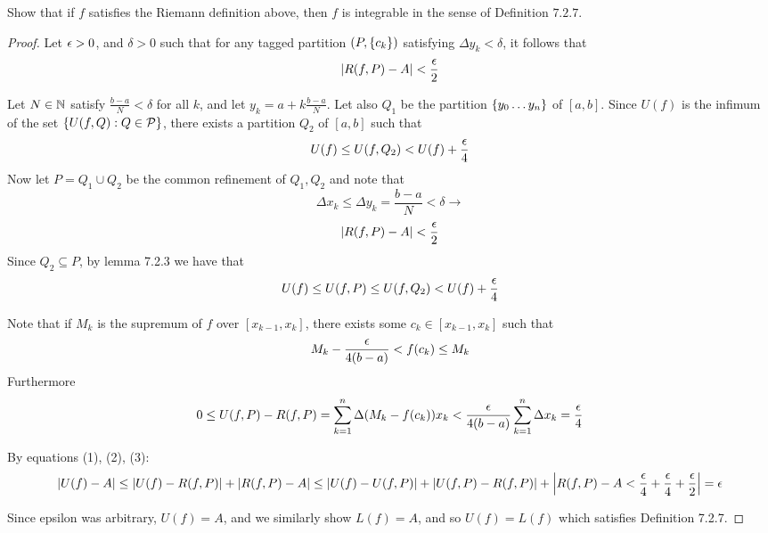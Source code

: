 \documentclass{exam}
\begin{document}
Show that if $f$ satisfies the Riemann definition above, then $f$ is integrable in the sense of Definition $7.2.7$.
\begin{proof}
    Let $\epsilon > 0$, and $\delta > 0$ such that for any tagged partition $(P, \left \{ c_k \right \})$ satisfying $\Delta y_k < \delta$, it follows that
    $$\left| R(f, P) - A \right| < \frac{\epsilon}{2}$$

    Let $N \in \mathbb {N}$ satisfy $\frac{b - a}{N} < \delta$ for all $k$, and let $y_k = a + k\frac{b - a}{N}$. Let also $Q_1$ be the partition $\left \{ y_0 \hdots y_n \right \}$ of $[a, b]$. Since $U(f)$ is the infimum of the set $\left \{ U(f, Q) : Q \in \mathcal{P} \right \}$, there exists a partition $Q_2$ of $[a, b]$ such that
    $$U(f) \leq U(f, Q_2) < U(f) + \frac{\epsilon}{4}$$
    Now let $P = Q_1 \cup Q_2$ be the common refinement of $Q_1, Q_2$ and note that
    $$\Delta x_k \leq \Delta y_k = \frac{b - a}{N} < \delta \longrightarrow$$
    \begin{equation}\left| R(f, P) - A \right| < \frac{\epsilon}{2}\end{equation}
    Since $Q_2 \subseteq P$, by lemma 7.2.3 we have that
    \begin{equation}U(f) \leq U(f, P) \leq U(f, Q_2) < U(f) + \frac{\epsilon}{4}\end{equation}

    Note that if $M_k$ is the supremum of $f$ over $[x_{k - 1}, x_k]$, there exists some $c_k\in [x_{k - 1}, x_k]$ such that
    $$M_k - \frac{\epsilon}{4(b - a)} < f(c_k) \leq M_k$$
    Furthermore
    \begin{equation}0 \leq U(f, P) - R(f, P) = \sum_{k = 1}^n \Delta (M_k - f(c_k))x_k < \frac{\epsilon}{4(b - a)}\sum_{k = 1}^n \Delta x_k = \frac{\epsilon}{4}\end{equation}

    By equations (1), (2), (3):
    $$\left| U(f) - A \right| \leq \left| U(f) - R(f, P) \right| + \left| R(f, P) - A \right| \leq \left| U(f) - U(f, P) \right| + \left| U(f, P) - R(f, P) \right| + \left| R(f, P) - A < \frac{\epsilon}{4} + \frac{\epsilon}{4} + \frac{\epsilon}{2} \right| = \epsilon$$

    Since epsilon was arbitrary, $U(f) = A$, and we similarly show $L(f) = A$, and so $U(f) = L(f)$ which satisfies Definition 7.2.7.
\end{proof}
\end{document}

